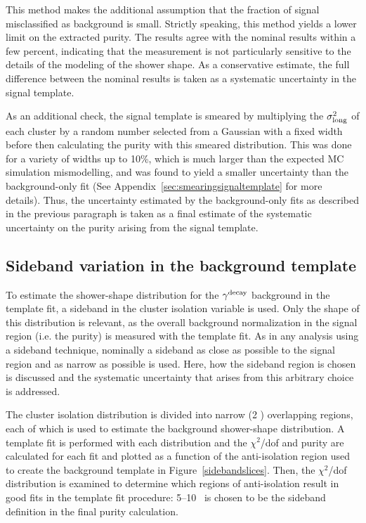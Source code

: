 This method makes the additional assumption that the fraction of signal misclassified as background is small. Strictly speaking, this method yields a lower limit on the extracted purity. The results agree with the nominal results within a few percent, indicating that the measurement is not particularly sensitive to the details of the modeling of the shower shape. As a conservative estimate, the full difference between the nominal results is taken as a systematic uncertainty in the signal template.

As an additional check, the signal template is smeared by multiplying the $\sigma^{2}_{\mathrm{long}}$ of each cluster by a random number selected from a Gaussian with a fixed width before then calculating the purity with this smeared distribution. This was done for a variety of widths up to 10\%, which is much larger than the expected MC simulation mismodelling, and was found to yield a smaller uncertainty than the background-only fit (See Appendix~\ref{sec:smearingsignaltemplate} for more details). Thus, the uncertainty estimated by the background-only fits as described in the previous paragraph is taken as a final estimate of the systematic uncertainty on the purity arising from the signal template.

\FloatBarrier
\subsection{Sideband variation in the background template}
\label{sec:bkgtemplate}
To estimate the shower-shape distribution for the $\gamma^\mathrm{decay}$ background in the template fit, a sideband in the cluster isolation variable is used. Only the shape of this distribution is relevant, as the overall background normalization in the signal region (i.e. the purity) is measured with the template fit. As in any analysis using a sideband technique, nominally a sideband as close as possible to the signal region and as narrow as possible is used. Here, how the sideband region is chosen is discussed and the systematic uncertainty that arises from this arbitrary choice is addressed.

The cluster isolation distribution is divided into narrow (2 \GeVc) overlapping regions, each of which is used to estimate the background shower-shape distribution. A template fit is performed with each distribution and the $\chi^2$/dof and purity are calculated for each fit and plotted as a function of the anti-isolation region used to create the background template in Figure~\ref{sidebandslices}. Then, the $\chi^2$/dof distribution is examined to determine which regions of anti-isolation result in good fits in the template fit procedure: 5--10 \GeVc~is chosen to be the sideband definition in the final purity calculation.

